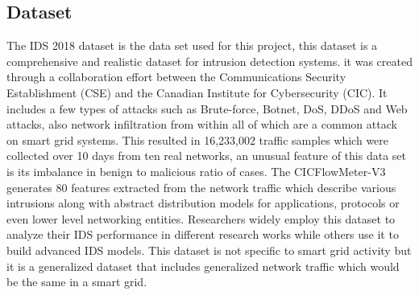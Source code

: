 










\subsection{Dataset}\label{Dataset}
The IDS 2018 dataset is the data set used for this project, this dataset is a comprehensive and realistic dataset for intrusion detection systems. it was created through a collaboration effort between the Communications Security Establishment (CSE) and the Canadian Institute for Cybersecurity (CIC). It includes a few types of attacks such as Brute-force, Botnet, DoS, DDoS and Web attacks, also network infiltration from within all of which are a common attack on smart grid systems. This resulted in 16,233,002 traffic samples which were collected over 10 days from ten real networks, an unusual feature of this data set is its imbalance in benign to malicious ratio of cases. The CICFlowMeter-V3 generates 80 features extracted from the network traffic which describe various intrusions along with abstract distribution models for applications, protocols or even lower level networking entities. Researchers widely employ this dataset to analyze their IDS performance in different research works while others use it to build advanced IDS models. This dataset is not specific to smart grid activity but it is a generalized dataset that includes generalized network traffic which would be the same in a smart grid.




